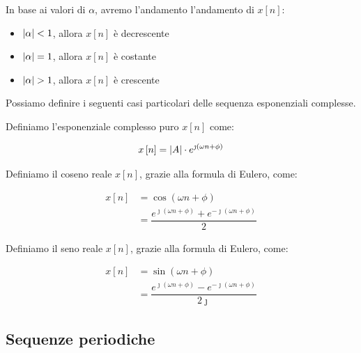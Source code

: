 In base ai valori di $\alpha$, 
avremo l'andamento l'andamento di $x \left[ n \right]$: 

\begin{itemize}
    \item $\abs{\alpha} < 1 $, allora $x \left[ n \right]$ è decrescente 
    \item $\abs{\alpha} = 1 $, allora $x \left[ n \right]$ è costante 
    \item $\abs{\alpha} > 1 $, allora $x \left[ n \right]$ è crescente
\end{itemize}

Possiamo definire i seguenti casi particolari delle sequenza esponenziali complesse. \newline 

Definiamo l'esponenziale complesso puro $x \left[ n \right]$ come: 

{
    \Large 
    \begin{equation}
        x \left[ n \right]
        =
        \abs{A} \cdot e^{\jmath \left( \omega n + \phi\right)}
    \end{equation}
}

Definiamo il coseno reale $x \left[ n \right]$, 
grazie alla formula di Eulero, come: 

{
    \Large 
    \begin{equation}
        \begin{split}
        x \left[ n \right]
        &=
        \cos(\omega n + \phi)
        \\
        &=
        \dfrac{e^{\jmath \left( \omega n + \phi\right)} + e^{-\jmath \left( \omega n + \phi\right)}}{2}
        \end{split}
    \end{equation}
}

Definiamo il seno reale $x \left[ n \right]$, 
grazie alla formula di Eulero, come: 

{
    \Large 
    \begin{equation}
        \begin{split}
        x \left[ n \right]
        &=
        \sin(\omega n + \phi)
        \\
        &=
        \dfrac{e^{\jmath \left( \omega n + \phi\right)} - e^{-\jmath \left( \omega n + \phi\right)}}{2 \jmath}
        \end{split}
    \end{equation}

}

\newpage 

\subsection{Sequenze periodiche}

